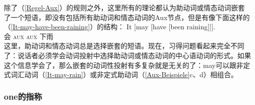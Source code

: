 除了（\ref{Regel-Aux}）的规则之外，这里所有的理论都认为助动词或情态动词嵌套了一个短语，即没有包括所有助动词和情态动词的Aux节点，但是有像下面这样的（\ref{It-may-have-been-raining}）的结构：
\ea
\gll It [may [have [been raining]]].\\
     \expl{} \spacebr{}会 \spacebr\textsc{aux} \spacebr\textsc{aux} 下雨\\
\z
这里，助动词和情态动词总是选择嵌套的短语。现在，习得问题看起来完全不同了：说话者必须学会动词投射中选择助动词或情态动词的中心语动词的形式。如果这个信息学会了，那么嵌套的动词性投射有多复杂就是无关的了：may可以跟非定式词汇动词（\ref{It-may-rain}）或非定式助动词（\ref{Aux-Beispiele}c、d）相组合。

\subsubsection{one的指称}

